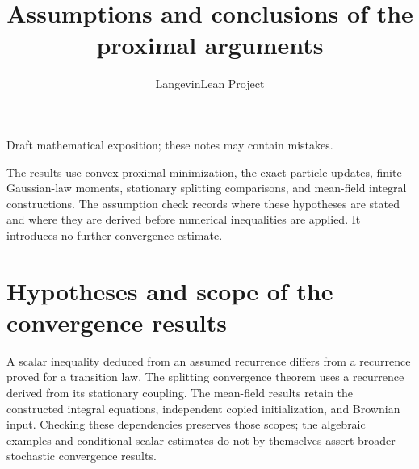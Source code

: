\documentclass[11pt,a4paper]{article}
\title{\texorpdfstring{Assumptions and conclusions of the proximal arguments}{Assumptions and conclusions of the proximal arguments}}
\author{LangevinLean Project}
\date{}
\begin{document}
\maketitle
Draft mathematical exposition; these notes may contain mistakes.


The results use convex proximal minimization, the exact particle updates, finite Gaussian-law moments, stationary splitting comparisons, and mean-field integral constructions. The assumption check records where these hypotheses are stated and where they are derived before numerical inequalities are applied. It introduces no further convergence estimate.



\section{\texorpdfstring{Hypotheses and scope of the convergence results}{Hypotheses and scope of the convergence results}}


A scalar inequality deduced from an assumed recurrence differs from a recurrence proved for a transition law. The splitting convergence theorem uses a recurrence derived from its stationary coupling. The mean-field results retain the constructed integral equations, independent copied initialization, and Brownian input. Checking these dependencies preserves those scopes; the algebraic examples and conditional scalar estimates do not by themselves assert broader stochastic convergence results.
\end{document}
